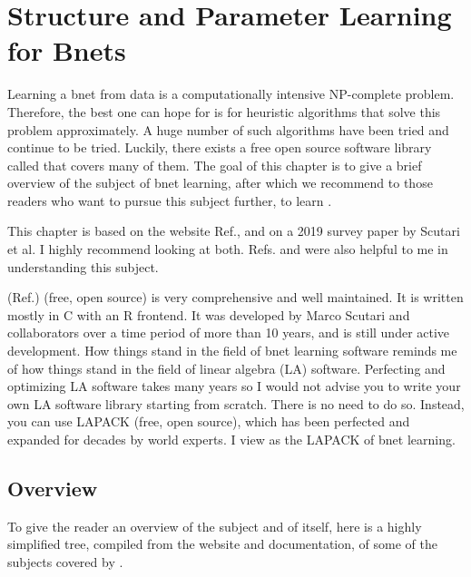 \chapter{Structure and Parameter
 Learning for Bnets}\label{ch-struc-learn}


Learning a bnet
from data
is a computationally intensive NP-complete
problem. 
Therefore,
the best one can hope
for is for heuristic algorithms 
that solve this problem
approximately. A huge number 
of such algorithms have been tried
and continue to be tried.
Luckily,
there exists a free open source
 software library
called \bnlearn
that covers many of
them. The goal
of this chapter
is to give
a brief
overview
of the subject
of bnet 
learning,
after 
which
we recommend
to
those readers who
want to
pursue this subject
further,
to 
learn \bnlearn.

This chapter
is based on  
the \bnlearn website Ref.\cite{bnlearn}, and
on a 2019 survey
paper 
\cite{scutari2019}
by Scutari et al.
I highly recommend looking
at both. Refs.
\cite{carvalho} and \cite{margaritis}
were also
helpful to me in understanding this subject.

\bnlearn (Ref.\cite{bnlearn})
(free, open source) is 
very
comprehensive
and well
maintained. It
is 
written 
mostly in C with
an R frontend.
It was
developed by Marco Scutari
and collaborators
over a time period of
more than 10 years,
and is still
under active development.
How things stand
in the field of
bnet learning software reminds me
of how things stand in 
the field of linear 
algebra (LA) software. Perfecting and
optimizing
LA software
takes many years so
I would not
advise you to write your own
LA software library starting
from scratch.
There is no need to do so. Instead, you
can use LAPACK (free, open source), which
has been perfected and expanded
for decades by world experts. 
I view \bnlearn as the LAPACK
of bnet learning. 



\section{Overview}

To give
the reader an overview
of the subject
and of \bnlearn itself,
here is a highly
simplified tree,
compiled from
the \bnlearn website
and documentation,
of some of the
subjects covered by \bnlearn.




